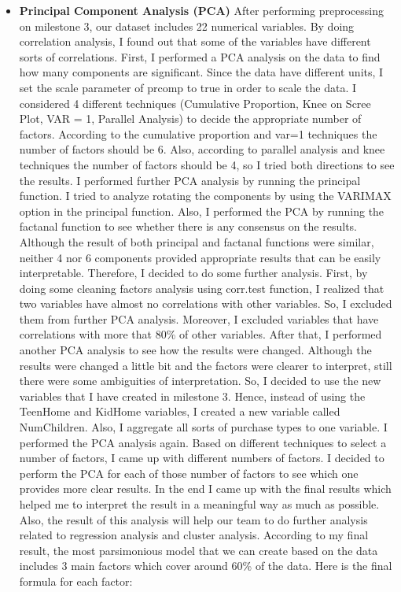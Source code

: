 \documentclass[11pt]{article} %
\begin{document}
\begin{itemize}
\item \textbf{Principal Component Analysis (PCA)}
\newline
After performing preprocessing on milestone 3, our dataset includes 22 numerical variables. By doing correlation analysis, I found out that some of the variables have different sorts of correlations. First, I performed a PCA analysis on the data to find how many components are significant. Since the data have different units, I set the scale parameter of prcomp to true in order to scale the data. I considered 4 different techniques (Cumulative Proportion, Knee on Scree Plot, VAR = 1, Parallel Analysis) to decide the appropriate number of factors. According to the cumulative proportion and var=1 techniques the number of factors should be 6. Also, according to parallel analysis and knee techniques the number of factors should be 4, so I tried both directions to see the results. I performed further PCA analysis by running the principal function. I tried to analyze rotating the components by using the VARIMAX option in the principal function. Also, I performed the PCA by running the factanal function to see whether there is any consensus on the results. Although the result of both principal and factanal functions were similar, neither 4 nor 6 components provided appropriate results that can be easily interpretable. Therefore, I decided to do some further analysis. First, by doing some cleaning factors analysis using corr.test function, I realized that two variables have almost no correlations with other variables. So, I excluded them from further PCA analysis. Moreover, I excluded variables that have correlations with more that 80\% of other variables. After that, I performed another PCA analysis to see how the results were changed.  Although the results were changed a little bit and the factors were clearer to interpret, still there were some ambiguities of interpretation. So, I decided to use the new variables that I have created in milestone 3. Hence, instead of using the TeenHome and KidHome variables, I created a new variable called NumChildren. Also, I aggregate all sorts of purchase types to one variable. I performed the PCA analysis again. Based on different techniques to select a number of factors, I came up with different numbers of factors. I decided to perform the PCA for each of those number of factors to see which one provides more clear results. In the end I came up with the final results which helped me to interpret the result in a meaningful way as much as possible. Also, the result of this analysis will help our team to do further analysis related to regression analysis and cluster analysis. According to my final result, the most parsimonious model that we can create based on the data includes 3 main factors which cover around 60\% of the data. Here is the final formula for each factor:

\end{itemize}
\end{document}
